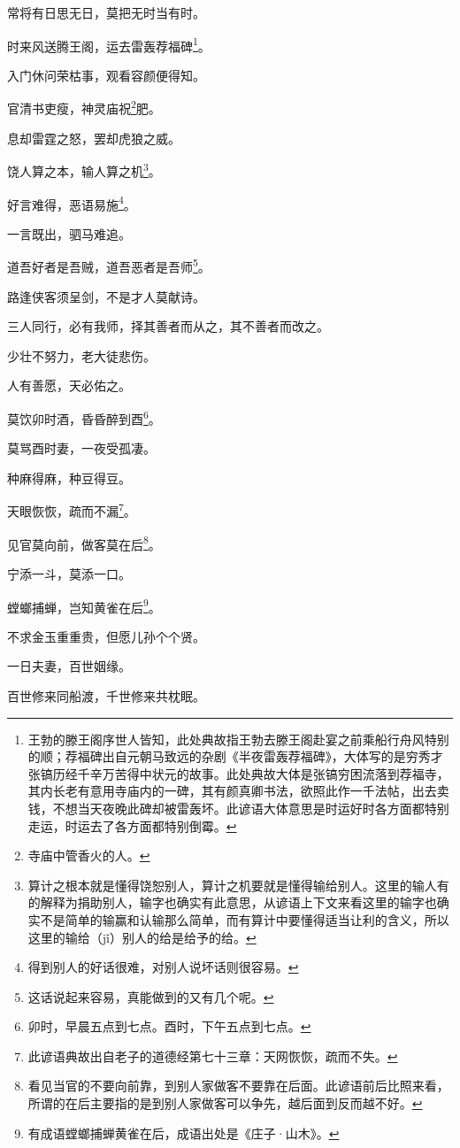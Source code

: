 \documentclass[12pt,oneside]{book}
\begin{document}
常将有日思无日，莫把无时当有时。

时来风送腾王阁，运去雷轰荐福碑\footnote{王勃的滕王阁序世人皆知，此处典故指王勃去滕王阁赴宴之前乘船行舟风特别的顺；荐福碑出自元朝马致远的杂剧《半夜雷轰荐福碑》，大体写的是穷秀才张镐历经千辛万苦得中状元的故事。此处典故大体是张镐穷困流落到荐福寺，其内长老有意用寺庙内的一碑，其有颜真卿书法，欲照此作一千法帖，出去卖钱，不想当天夜晚此碑却被雷轰坏。此谚语大体意思是时运好时各方面都特别走运，时运去了各方面都特别倒霉。}。

入门休问荣枯事，观看容颜便得知。

官清书吏瘦，神灵庙祝\footnote{寺庙中管香火的人。}肥。

息却雷霆之怒，罢却虎狼之威。

饶人算之本，输人算之机\footnote{算计之根本就是懂得饶恕别人，算计之机要就是懂得输给别人。这里的输人有的解释为捐助别人，输字也确实有此意思，从谚语上下文来看这里的输字也确实不是简单的输赢和认输那么简单，而有算计中要懂得适当让利的含义，所以这里的输给（jǐ）别人的给是给予的给。}。

好言难得，恶语易施\footnote{得到别人的好话很难，对别人说坏话则很容易。}。

一言既出，驷马难追。

道吾好者是吾贼，道吾恶者是吾师\footnote{这话说起来容易，真能做到的又有几个呢。}。

路逢侠客须呈剑，不是才人莫献诗。

三人同行，必有我师，择其善者而从之，其不善者而改之。

少壮不努力，老大徒悲伤。

人有善愿，天必佑之。

莫饮卯时酒，昏昏醉到酉\footnote{卯时，早晨五点到七点。酉时，下午五点到七点。}。

莫骂酉时妻，一夜受孤凄。

种麻得麻，种豆得豆。

天眼恢恢，疏而不漏\footnote{此谚语典故出自老子的道德经第七十三章：天网恢恢，疏而不失。}。

见官莫向前，做客莫在后\footnote{看见当官的不要向前靠，到别人家做客不要靠在后面。此谚语前后比照来看，所谓的在后主要指的是到别人家做客可以争先，越后面到反而越不好。}。

宁添一斗，莫添一口。

螳螂捕蝉，岂知黄雀在后\footnote{有成语螳螂捕蝉黄雀在后，成语出处是《庄子·山木》。}。

不求金玉重重贵，但愿儿孙个个贤。

一日夫妻，百世姻缘。

百世修来同船渡，千世修来共枕眠。
\end{document}
